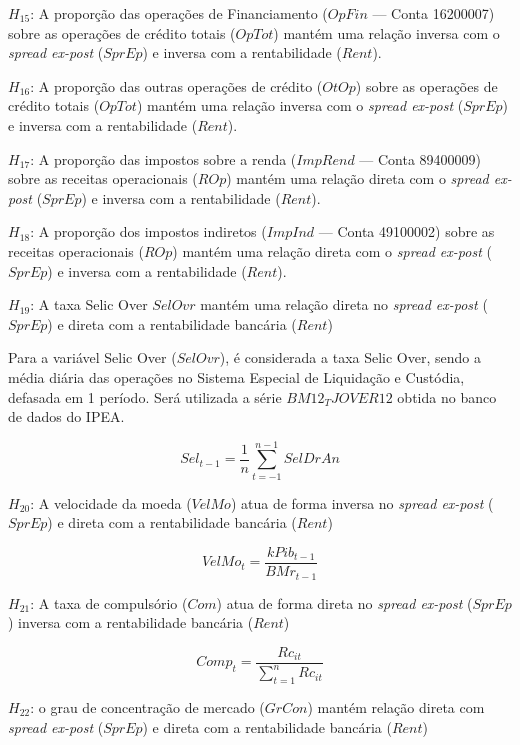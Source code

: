 \documentclass[
  12pt,
  12pt,
  openright,
  oneside,
  a4paper,
  chapter=TITLE,
  section=TITLE,
  subsection=TITLE,
  subsubsection=TITLE,
  portugues,
  sumario=tradicional]{abntex2}
\begin{document}
\(H_{15}\): A proporção das operações de Financiamento (\(OpFin\) --- Conta 16200007) sobre as operações de crédito totais (\(OpTot\)) mantém uma relação inversa com o \emph{spread ex-post} (\(SprEp\)) e inversa com a rentabilidade (\(Rent\)).

\(H_{16}\): A proporção das outras operações de crédito (\(OtOp\)) sobre as operações de crédito totais (\(OpTot\)) mantém uma relação inversa com o \emph{spread ex-post} (\(SprEp\)) e inversa com a rentabilidade (\(Rent\)).

\(H_{17}\): A proporção das impostos sobre a renda (\(ImpRend\) --- Conta 89400009) sobre as receitas operacionais (\(ROp\)) mantém uma relação direta com o \emph{spread ex-post} (\(SprEp\)) e inversa com a rentabilidade (\(Rent\)).

\(H_{18}\): A proporção dos impostos indiretos (\(ImpInd\) --- Conta 49100002) sobre as receitas operacionais (\(ROp\)) mantém uma relação direta com o \emph{spread ex-post} (\(SprEp\)) e inversa com a rentabilidade (\(Rent\)).

\(H_{19}\): A taxa Selic Over \(SelOvr\) mantém uma relação direta no \emph{spread ex-post} (\(SprEp\)) e direta com a rentabilidade bancária (\(Rent\))

Para a variável Selic Over (\(SelOvr\)), é considerada a taxa Selic Over, sendo a média diária das operações no Sistema Especial de Liquidação e Custódia, defasada em 1 período. Será utilizada a série \(BM12_TJOVER12\) obtida no banco de dados do IPEA.

\begin{equation}
Sel_{t-1} = \frac{1}{n}\sum_{t=-1}^{n-1}SelDrAn
\end{equation}

\(H_{20}\): A velocidade da moeda (\(VelMo\)) atua de forma inversa no \emph{spread ex-post} (\(SprEp\)) e direta com a rentabilidade bancária (\(Rent\))

\begin{equation}
VelMo_{t} = \frac{k Pib_{t-1}}{BMr_{t-1}}
\end{equation}

\(H_{21}\): A taxa de compulsório (\(Com\)) atua de forma direta no \emph{spread ex-post} (\(SprEp\)) inversa com a rentabilidade bancária (\(Rent\))

\begin{equation}
Comp_{t} = \frac{Rc_{it}}{\sum_{t=1}^{n}Rc_{it}}
\end{equation}

\(H_{22}\): o grau de concentração de mercado (\(GrCon\)) mantém relação direta com \emph{spread ex-post} (\(SprEp\)) e direta com a rentabilidade bancária (\(Rent\))
\end{document}
